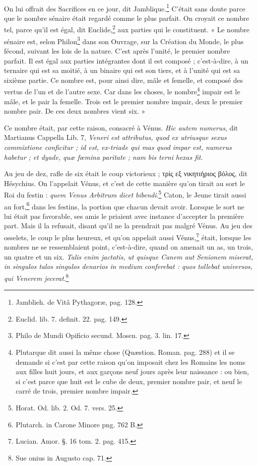 \documentclass[a4paper, 18pt, oneside]{article}
\begin{document}
\paragraph{}
On lui offrait des Sacrifices en ce jour, dit Jamblique.\footnote{Jamblieh. de Vitâ Pythagoræ, pag. 128.} C'était sans doute parce que le nombre sénaire était regardé comme le plus parfait. On croyait ce nombre tel, parce qu'il est égal, dit Euclide,\footnote{Euclid. lib. 7. definit. 22. pag. 149.} aux parties qui le constituent. « Le nombre sénaire est, selon Philon\footnote{Philo de Mundi Opificio secund. Mosen. pag. 3. lin. 17.} dans son Ouvrage, sur la Création du Monde, le plus fécond, suivant les lois de la nature. C'est après l'unité, le premier nombre parfait. Il est égal aux parties intégrantes dont il est composé ; c'est-à-dire, à un ternaire qui est sa moitié, à un binaire qui est son tiers, et à l'unité qui est sa sixième partie. Ce nombre est, pour ainsi dire, mâle et femelle, et composé des vertus de l'un et de l'autre sexe. Car dans les choses, le nombre\footnote{Plutarque dit aussi la même chose (Quæstion. Roman. pag. 288) et il se demande si c'est par cette raison qu'on imposait chez les Romains les noms aux filles huit jours, et aux garçons neuf jours après leur naissance : ou bien, si c'est parce que huit est le cube de deux, premier nombre pair, et neuf le carré de trois, premier nombre impair.} impair est le mâle, et le pair la femelle. Trois est le premier nombre impair, deux le premier nombre pair. De ces deux nombres vient six. »

Ce nombre était, par cette raison, consacré à Vénus. \emph{Hic autem numerus}, dit Martianus Cappella Lib. 7, \emph{Veneri est attributus, quod ex utriusque sexus commixtione conficitur ; id est, ex-triade qui mas quod impar est, numerus habetur ; et dyade, quæ fœmina paritate ; nam bis terni hexas fit}.

Au jeu de dez, rafle de six était le coup victorieux ; τρίς εξ νικητιήριος βόλος, dit Hésychius. On l'appelait Vénus, et c'est de cette manière qu'on tirait au sort le Roi du festin : \emph{quem Venus Arbitrum dicet bibendi}.\footnote{Horat. Od. lib. 2. Od. 7. vers. 25.} Caton, le Jeune tirait aussi au fort,\footnote{Plutarch. in Carone Minore png. 762 B.} dans les festins, la portion que chacun devait avoir. Lorsque le sort ne lui était pas favorable, ses amis le priaient avec instance d'accepter la première part. Mais il la refusait, disant qu'il ne la prendrait pas malgré Vénus. Au jeu des osselets, le coup le plus heureux, et qu'on appelait aussi Vénus,\footnote{Lucian. Amor. §. 16 tom. 2. pag. 415.} était, lorsque les nombres ne se ressemblaient point, c'est-à-dire, quand on amenait un as, un trois, un quatre et un six. \emph{Talis enim jactatis, ut quisque Canem aut Senionem miserat, in singulos talos singulos denarios in medium conferebat : quos tollebat universos, qui Venerem jecerat}.\footnote{Sue onius in Augusto cap. 71.}
\end{document}
